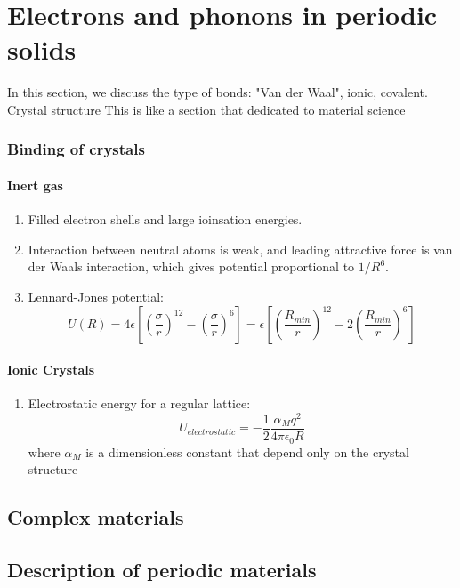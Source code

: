 \documentclass[12pt,a4paper]{article}
\begin{document}
\section{Electrons and phonons in periodic solids}
    In this section, we discuss the type of bonds: "Van der Waal", ionic, covalent. Crystal structure
    This is like a section that dedicated to material science
    \subsubsection{Binding of crystals}
        \paragraph*{Inert gas}
        \begin{enumerate}
            \item Filled electron shells and large ioinsation energies.
            \item Interaction between neutral atoms is weak, and leading attractive force is van der Waals interaction, which gives potential proportional to $1/R^6$.
            \item Lennard-Jones potential:
            \begin{equation}
                U(R) = 4\epsilon[(\dfrac{\sigma}{r})^{12}-(\dfrac{\sigma}{r})^{6}] = \epsilon[(\dfrac{R_{min}}{r})^{12}-2(\dfrac{R_{min}}{r})^{6}]
            \end{equation}
        \end{enumerate}
        \paragraph*{Ionic Crystals}
            \begin{enumerate}
                \item Electrostatic energy for a regular lattice:
                \begin{equation}
                    U_{electrostatic} = -\frac{1}{2}\frac{\alpha_M q^2}{4\pi \epsilon_0 R}
                \end{equation}
                where $\alpha_M$ is a dimensionless constant that depend only on the crystal structure
            \end{enumerate}
    \subsection{Complex materials}
    \subsection{Description of periodic materials}
\end{document}
